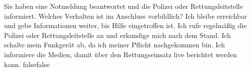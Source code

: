     {Sie haben eine Notmeldung beantwortet und die Polizei oder Rettungsleitstelle informiert. Welches Verhalten ist im Anschluss vorbildlich?}
    {Ich bleibe erreichbar und gebe Informationen weiter, bis Hilfe eingetroffen ist.}
    {Ich rufe regelmäßig die Polizei oder Rettungsleitstelle an und erkundige mich nach dem Stand.}
    {Ich schalte mein Funkgerät ab, da ich meiner Pflicht nachgekommen bin.}
    {Ich informiere die Medien, damit über den Rettungseinsatz live berichtet werden kann.}
    {false}{false}